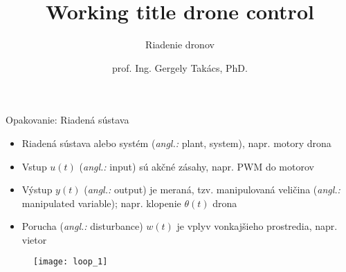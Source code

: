 \documentclass{beamer}
\title[Riadiace Algoritmy Dronov]
{Working title drone control}
\subtitle{\vspace{1em}Riadenie dronov}
\author[]{prof. Ing. Gergely Takács, PhD.}
\date[XX.12.2021]{}
\newcommand{\angl}[1]{{\color{gray}(\emph{angl.:} #1)}}
\begin{document}



%
%
%


%


\begin{frame}{Opakovanie: Riadená sústava}
  \begin{itemize}
    \item<1-> Riadená sústava alebo systém \angl{plant, system}, napr. motory drona
    \item<2-> Vstup $u(t)$ \angl{input} sú akčné zásahy, napr. PWM do motorov
    \item<3-> Výstup $y(t)$ \angl{output} je meraná, tzv. manipulovaná veličina \angl{manipulated variable}; napr. klopenie $\theta(t)$ drona
    \item<4-> Porucha \angl{disturbance} $w(t)$ je vplyv vonkajšieho prostredia, napr. vietor
  \end{itemize}

\begin{figure}
\centering
  \texttt{[image: loop\_1]}\\
\end{figure}
\end{frame}
\end{document}
